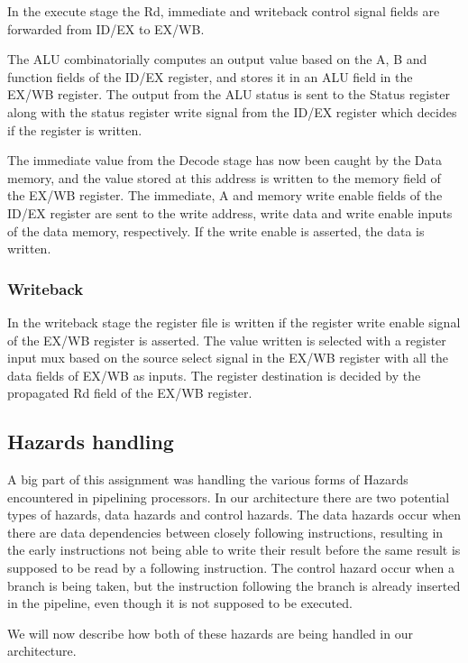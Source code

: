 \documentclass[11pt]{report}
\begin{document}
In the execute stage the Rd, immediate and writeback control signal fields are 
forwarded from ID/EX to EX/WB. 

The ALU combinatorially computes an output value based on
the A, B and function fields of the ID/EX register, and stores it in an ALU field in
the EX/WB register. The output from the ALU status is sent to the Status register along
with the status register write signal from the ID/EX register which decides if the 
register is written.

The immediate value from the Decode stage has now been caught 
by the Data memory, and the value stored at this address is written to the memory field
of the EX/WB register. The immediate, A and memory write enable fields of the ID/EX register
are sent to the write address, write data and write enable inputs of the data memory,
respectively. If the write enable is asserted, the data is written.

\subsubsection*{Writeback}

In the writeback stage the register file is written if the register write enable
signal of the EX/WB register is asserted. The value written is selected with a register
input mux based on the source select signal in the EX/WB register with all the data fields
of EX/WB as inputs. The register destination is decided by the propagated Rd field of the
EX/WB register.



\subsection*{Hazards handling}

A big part of this assignment was handling the various forms of Hazards 
encountered in pipelining processors. In our architecture there are two potential
types of hazards, data hazards and control hazards. The data hazards occur when there 
are data dependencies between closely following instructions, resulting in the
early instructions not being able to write their result before the same result is 
supposed to be read by a following instruction. The control hazard occur when a branch
is being taken, but the instruction following the branch is already inserted in the pipeline,
even though it is not supposed to be executed.

We will now describe how both of these hazards are being handled in our architecture.
\end{document}

